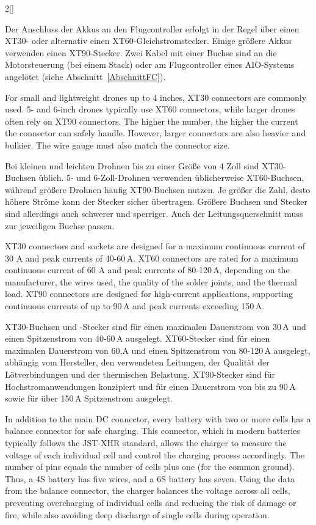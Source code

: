 \begin{paracol}{2}[]
\colger

Der Anschluss der Akkus an den Flugcontroller erfolgt in der Regel über einen XT30- oder alternativ einen XT60-Gleichstromstecker. Einige größere Akkus verwenden einen XT90-Stecker. Zwei Kabel mit einer Buchse sind an die Motorsteuerung (bei einem Stack) oder am Flugcontroller eines AIO-Systems angelötet (siehe Abschnitt~\ref{AbschnittFC}).
 
\coleng

For small and lightweight drones up to 4 inches, XT30 connectors are commonly used. 5- and 6-inch drones typically use XT60 connectors, while larger drones often rely on XT90 connectors. The higher the number, the higher the current the connector can safely handle. However, larger connectors are also heavier and bulkier. The wire gauge must also match the connector size.

\colger

Bei kleinen und leichten Drohnen bis zu einer Größe von 4 Zoll sind XT30-Buchsen üblich. 5- und 6-Zoll-Drohnen verwenden üblicherweise XT60-Buchsen, während größere Drohnen häufig XT90-Buchsen nutzen. Je größer die Zahl, desto höhere Ströme kann der Stecker sicher übertragen. Größere Buchsen und Stecker sind allerdings auch schwerer und sperriger. Auch der Leitungsquerschnitt muss zur jeweiligen Buchse passen.

\coleng

XT30 connectors and sockets are designed for a maximum continuous current of 30 A and peak currents of 40-60\,A. XT60 connectors are rated for a maximum continuous current of 60 A and peak currents of 80-120\,A, depending on the manufacturer, the wires used, the quality of the solder joints, and the thermal load. XT90 connectors are designed for high-current applications, supporting continuous currents of up to 90\,A and peak currents exceeding 150\,A.

\colger

XT30-Buchsen und -Stecker sind für einen maximalen Dauerstrom von 30\,A und einen Spitzenstrom von 40-60\,A ausgelegt. XT60-Stecker sind für einen maximalen Dauerstrom von 60,A und einen Spitzenstrom von 80-120\,A ausgelegt, abhängig vom Hersteller, den verwendeten Leitungen, der Qualität der Lötverbindungen und der thermischen Belastung. XT90-Stecker sind für Hochstromanwendungen konzipiert und für einen Dauerstrom von bis zu 90\,A sowie für über 150\,A Spitzenstrom ausgelegt.

\coleng

In addition to the main DC connector, every battery with two or more cells has a balance connector for safe charging. This connector, which in modern batteries typically follows the JST-XHR standard, allows the charger to measure the voltage of each individual cell and control the charging process accordingly. The number of pins equals the number of cells plus one (for the common ground). Thus, a 4S battery has five wires, and a 6S battery has seven. Using the data from the balance connector, the charger balances the voltage across all cells, preventing overcharging of individual cells and reducing the risk of damage or fire, while also avoiding deep discharge of single cells during operation.


\end{paracol}
